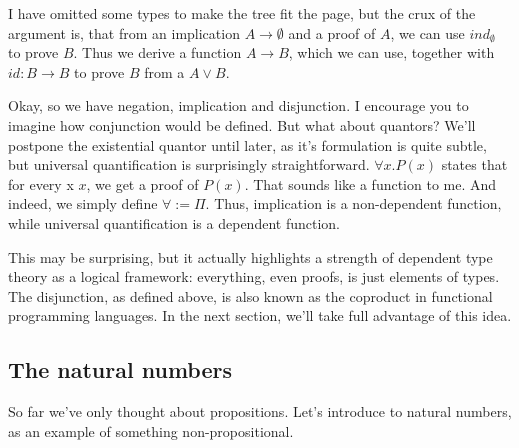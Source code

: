 \documentclass[a4paper, 12pt]{article}
\theoremstyle{changedot}
\theoremstyle{changedotbreak}
\theoremstyle{nonumberplain}
\begin{document}
I have omitted some types to make the tree fit the page, but the crux of the argument is, that from an implication $A \to \emptyset$ and a proof of $A$, we can use $ind_{\emptyset}$ to prove $B$. Thus we derive a function $A \to B$, which we can use, together with $id : B \to B$ to prove $B$ from a $A \lor B$.

Okay, so we have negation, implication and disjunction. I encourage you to imagine how conjunction would be defined. But what about quantors? We'll postpone the existential quantor until later, as it's formulation is quite subtle, but universal quantification is surprisingly straightforward. $\forall x. P(x)$ states that for every x $x$, we get a proof of $P(x)$. That sounds like a function to me. And indeed, we simply define $\forall := \Pi$. Thus, implication is a non-dependent function, while universal quantification is a dependent function.

This may be surprising, but it actually highlights a strength of dependent type theory as a logical framework: everything, even proofs, is just elements of types. The disjunction, as defined above, is also known as the coproduct in functional programming languages. In the next section, we'll take full advantage of this idea.

\subsection{The natural numbers}
So far we've only thought about propositions. Let's introduce to natural numbers, as an example of something non-propositional.
\end{document}
